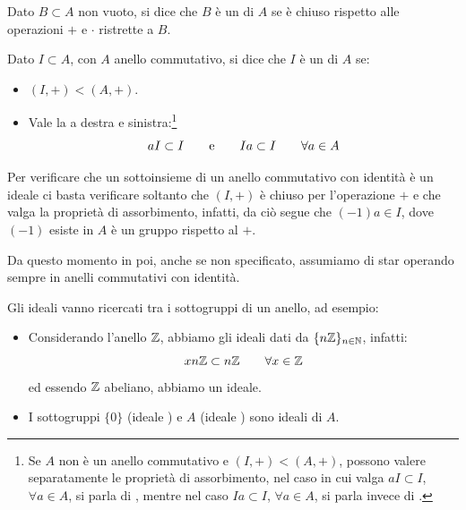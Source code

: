 \documentclass[11pt]{scrartcl}
\begin{document}
\begin{definition}
    Dato $B \subset A$ non vuoto, si dice che $B$ è un  di $A$ se è chiuso rispetto alle operazioni $+$ e $\cdot$ ristrette a $B$.
\end{definition}

\begin{definition}
    Dato $I \subset A$, con $A$ anello commutativo, si dice che $I$ è un  di $A$ se:
    \begin{itemize}
        \item $(I,+) < (A,+)$.
        \item Vale la  a destra e sinistra:\footnote{Se $A$ non è un anello commutativo e $(I,+) < (A,+)$, possono
        valere separatamente le proprietà di assorbimento, nel caso in cui valga $aI \subset I$, $\forall a \in A$, si parla di , mentre nel caso 
        $Ia \subset I$, $\forall a \in A$, si parla invece di .}
            \[ aI \subset I \qquad \text e \qquad Ia \subset I \qquad \forall a \in A
                \]
    \end{itemize}
\end{definition}

\begin{remark}
    Per verificare che un sottoinsieme di un anello commutativo con identità è un ideale ci basta verificare soltanto che $(I,+)$ è chiuso per l'operazione $+$ e che valga la proprietà di assorbimento, infatti, da ciò segue 
    che $(-1)a \in I$, dove $(-1)$ esiste in $A$ è un gruppo rispetto al $+$.
\end{remark}

Da questo momento in poi, anche se non specificato, assumiamo di star operando sempre in anelli commutativi con identità.

\begin{example}[Ideali]
    Gli ideali vanno ricercati tra i sottogruppi di un anello, ad esempio:
    \begin{itemize}
        \item Considerando l'anello $\mathbb Z$, abbiamo gli ideali dati da $\{n\mathbb Z\}_{n \in \mathbb N}$, infatti:
            \[ xn\mathbb Z \subset n\mathbb Z \qquad \forall x \in \mathbb Z
                \]
        ed essendo $\mathbb Z$ abeliano, abbiamo un ideale.
        \item I sottogruppi $\{0\}$ (ideale ) e $A$ (ideale ) sono ideali di $A$.
    \end{itemize}
\end{example}
\end{document}
